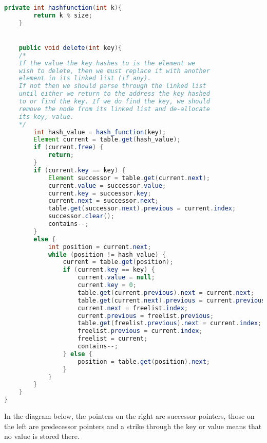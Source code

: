 \documentclass[10pt,\jkfside,a4paper]{article}
\begin{document}
\begin{enumerate}
\begin{enumerate}
\begin{lstlisting}[language=java]
    private int hashfunction(int k){
        return k % size;
    }


    public void delete(int key){
	/*
	If the value the key hashes to is the element we 
	wish to delete, then we must replace it with another 
	element in its linked list (if any).
	If not then we should parse through the linked list 
	until either we return to the address the key hashed 
	to or find the key. If we do find the key, we should 
	remove the node from its linked list and de-allocate 
	its key, value.
	*/
        int hash_value = hash_function(key);
        Element current = table.get(hash_value);
        if (current.free) {
            return;
        }
        if (current.key == key) {
            Element successor = table.get(current.next);
            current.value = successor.value;
            current.key = successor.key;
            current.next = successor.next;
            table.get(successor.next).previous = current.index;
            successor.clear();
            contains--;
        }
        else {
            int position = current.next;
            while (position != hash_value) {
                current = table.get(position);
                if (current.key == key) {
                    current.value = null;
                    current.key = 0;
                    table.get(current.previous).next = current.next;
                    table.get(current.next).previous = current.previous;
                    current.next = freelist.index;
                    current.previous = freelist.previous;
                    table.get(freelist.previous).next = current.index;
                    freelist.previous = current.index;
                    freelist = current;
                    contains--;
                } else {
                    position = table.get(position).next;
                }
            }
        }
    }
}
\end{lstlisting}

\end{enumerate}

In the diagram below, the pointers on the right are successor pointers, 
those on the left are predecessor pointers and a strike through the key 
or value means that no value is stored there.


\end{enumerate}
\end{document}
